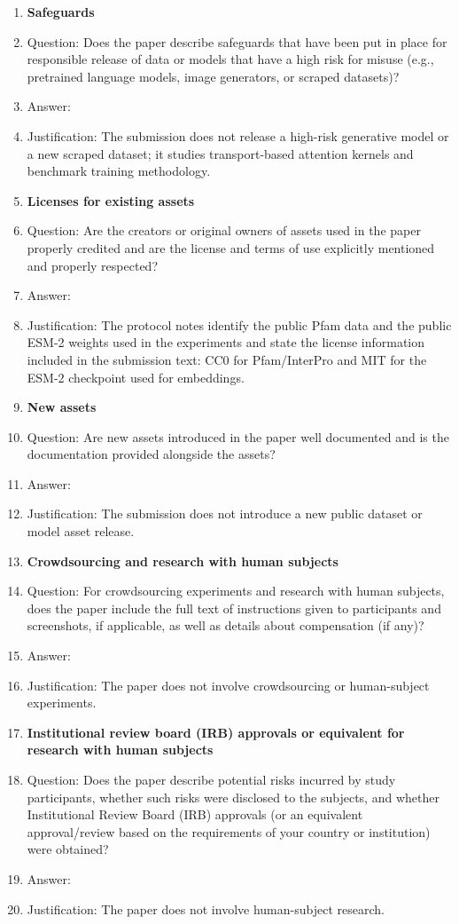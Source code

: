 \begin{enumerate}
\item {\bf Safeguards}
    \item[] Question: Does the paper describe safeguards that have been put in place for responsible release of data or models that have a high risk for misuse (e.g., pretrained language models, image generators, or scraped datasets)?
    \item[] Answer: \answerNA{}
    \item[] Justification: The submission does not release a high-risk generative model or a new scraped dataset; it studies transport-based attention kernels and benchmark training methodology.

\item {\bf Licenses for existing assets}
    \item[] Question: Are the creators or original owners of assets used in the paper properly credited and are the license and terms of use explicitly mentioned and properly respected?
    \item[] Answer: \answerYes{}
    \item[] Justification: The protocol notes identify the public Pfam data and the public ESM-2 weights used in the experiments and state the license information included in the submission text: CC0 for Pfam/InterPro and MIT for the ESM-2 checkpoint used for embeddings.

\item {\bf New assets}
    \item[] Question: Are new assets introduced in the paper well documented and is the documentation provided alongside the assets?
    \item[] Answer: \answerNA{}
    \item[] Justification: The submission does not introduce a new public dataset or model asset release.

\item {\bf Crowdsourcing and research with human subjects}
    \item[] Question: For crowdsourcing experiments and research with human subjects, does the paper include the full text of instructions given to participants and screenshots, if applicable, as well as details about compensation (if any)?
    \item[] Answer: \answerNA{}
    \item[] Justification: The paper does not involve crowdsourcing or human-subject experiments.

\item {\bf Institutional review board (IRB) approvals or equivalent for research with human subjects}
    \item[] Question: Does the paper describe potential risks incurred by study participants, whether such risks were disclosed to the subjects, and whether Institutional Review Board (IRB) approvals (or an equivalent approval/review based on the requirements of your country or institution) were obtained?
    \item[] Answer: \answerNA{}
    \item[] Justification: The paper does not involve human-subject research.


\end{enumerate}
